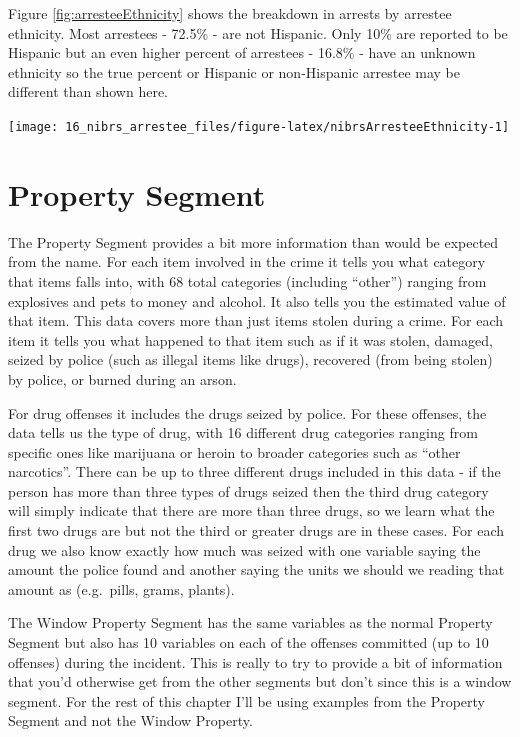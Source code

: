 \documentclass[
]{krantz}
\let\origfigure\figure
\let\endorigfigure\endfigure
\renewenvironment{figure}[1][2] {
    \expandafter\origfigure\expandafter[H]
} {
    \endorigfigure
}
\begin{document}
Figure \ref{fig:arresteeEthnicity} shows the breakdown in
arrests by arrestee ethnicity. Most arrestees - 72.5\% - are
not Hispanic. Only 10\% are reported to be Hispanic but an
even higher percent of arrestees - 16.8\% - have an unknown
ethnicity so the true percent or Hispanic or non-Hispanic
arrestee may be different than shown here.

\begin{figure}

{\centering \texttt{[image: 16\_nibrs\_arrestee\_files/figure-latex/nibrsArresteeEthnicity-1]} 

}

\caption{The share of arrestees by ethnicity, 1991-2022.}\label{fig:nibrsArresteeEthnicity}
\end{figure}

\chapter{Property Segment}\label{property}

The Property Segment provides a bit more information than
would be expected from the name. For each item involved in
the crime it tells you what category that items falls into,
with 68 total categories (including ``other'') ranging from
explosives and pets to money and alcohol. It also tells you
the estimated value of that item. This data covers more than
just items stolen during a crime. For each item it tells you
what happened to that item such as if it was stolen,
damaged, seized by police (such as illegal items like
drugs), recovered (from being stolen) by police, or burned
during an arson.

For drug offenses it includes the drugs seized by police.
For these offenses, the data tells us the type of drug, with
16 different drug categories ranging from specific ones like
marijuana or heroin to broader categories such as ``other
narcotics''. There can be up to three different drugs
included in this data - if the person has more than three
types of drugs seized then the third drug category will
simply indicate that there are more than three drugs, so we
learn what the first two drugs are but not the third or
greater drugs are in these cases. For each drug we also know
exactly how much was seized with one variable saying the
amount the police found and another saying the units we
should we reading that amount as (e.g.~pills, grams,
plants).

The Window Property Segment has the same variables as the
normal Property Segment but also has 10 variables on each of
the offenses committed (up to 10 offenses) during the
incident. This is really to try to provide a bit of
information that you'd otherwise get from the other segments
but don't since this is a window segment. For the rest of
this chapter I'll be using examples from the Property
Segment and not the Window Property.
\end{document}
